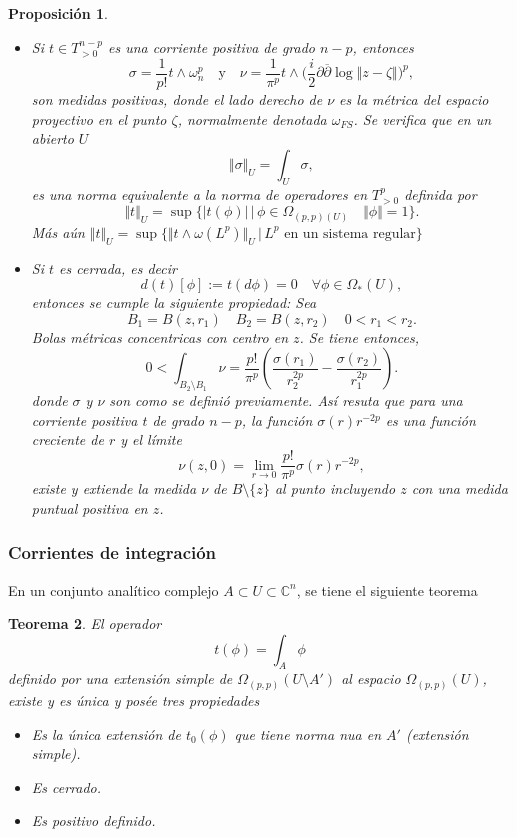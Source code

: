 \documentclass[letterpaper]{article}
\newtheorem{teorema}{Teorema}[section]
\newtheorem{prop}[teorema]{Proposici\'on}
\newcommand{\con}{\ensuremath{\mathbb{C}^n}}
\begin{document}
\begin{prop}
\begin{itemize}
        \item[4] Si $t\in T^{n-p}_{>0}$ es una corriente positiva de grado $n-p$, entonces
        \[
            \sigma=\frac{1}{p!}t\wedge\omega_n^{p}
            \quad\text{y}\quad
            \nu=\frac{1}{\pi^p}t\wedge\Big(\frac{i}{2}\partial\overline{\partial}\log\Vert z-\zeta\Vert\Big)^{p},
        \]
        son medidas positivas, donde el lado derecho de $\nu$ es la métrica del espacio proyectivo en el punto $\zeta$, normalmente denotada $\omega_{FS}$. Se verifica que en un abierto $U$
        \[
            \Vert\sigma\Vert_{U}=\int_{U}\sigma,
        \]
        es una norma equivalente a la norma de operadores en $T^p_{>0}$ definida por
        \[
            \Vert t\Vert_U=\sup\{|t(\phi)|\,\vert\,\phi\in \Omega_{(p,p)(U)}\quad\Vert\phi\Vert=1\}.
        \]
        Más aún $\Vert t\Vert_U=\sup\{\Vert t\wedge\omega(L^{p})\Vert_U\,\vert\,L^{p}\text{ en un sistema regular}\}$
        \item[5] Si $t$ es cerrada, es decir
        \[
            d(t)[\phi]:=t(d\phi)=0\quad\forall\phi\in\Omega_{*}(U),
        \]
        entonces se cumple la siguiente propiedad: Sea
        \[
            B_1=B(z,r_1)\quad B_2=B(z,r_2)\quad 0<r_1<r_2.
        \]
        Bolas métricas concentricas con centro en $z$. Se tiene entonces,
        \[
            0<\int_{B_2\setminus B_1}\nu= \frac{p!}{\pi^{p}}(\frac{\sigma(r_1)}{r^{2p}_2}-\frac{\sigma(r_2)}{r^{2p}_1}).
        \]
        donde $\sigma$ y $\nu$ son como se definió previamente. Así resuta que para una corriente positiva $t$ de grado $n-p$, la función $\sigma(r)r^{-2p}$ es una función creciente de $r$ y el límite
        \[
            \nu(z,0)=\lim_{r\rightarrow 0}\frac{p!}{\pi^{p}}\sigma(r)r^{-2p},
        \]
        existe y extiende la medida $\nu$ de $B\setminus\{z\}$ al punto incluyendo $z$ con una medida puntual positiva en $z$.
    \end{itemize}
\end{prop}
\subsubsection{Corrientes de integración}
\label{sec:org9982aa5}
En un conjunto analítico complejo \(A\subset U\subset\con\), se tiene el siguiente teorema
\begin{teorema}
El operador
\[
    t(\phi)=\int_A\phi
\]
definido por una extensión simple de $\Omega_{(p,p)}(U\setminus A')$ al espacio $\Omega_{(p,p)}(U)$, existe y es única y posée tres propiedades
\begin{itemize}
    \item[a] Es la única extensión de $t_0(\phi)$ que tiene norma nua en $A'$ (extensión simple).
    \item[b] Es cerrado.
    \item[c] Es positivo definido.
\end{itemize}
\end{teorema}
\end{document}
